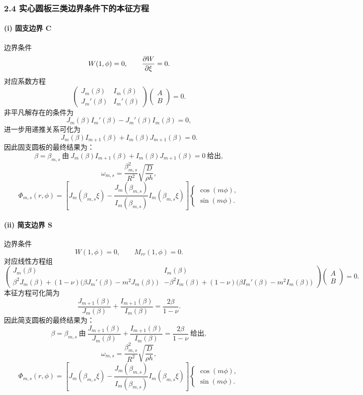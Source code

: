 \documentclass[12pt]{ctexart}
\begin{document}
\subsubsection*{2.4 实心圆板三类边界条件下的本征方程}

\paragraph{(i) 固支边界 C}
边界条件
\[
W(1,\phi)=0,\qquad \pdv{W}{\xi}(1,\phi)=0.
\]
对应系数方程
\[
\begin{pmatrix}
J_m(\beta) & I_m(\beta)\\
J_m'(\beta) & I_m'(\beta)
\end{pmatrix}
\begin{pmatrix} A\\ B \end{pmatrix}=0.
\]
非平凡解存在的条件为
\[
J_m(\beta)I_m'(\beta)-J_m'(\beta)I_m(\beta)=0,
\]
进一步用递推关系可化为
\[
J_m(\beta) I_{m+1}(\beta)+I_m(\beta) J_{m+1}(\beta)=0.
\]
因此固支圆板的最终结果为：
\[
\beta=\beta_{m,s}\ \text{由}\ 
J_m(\beta) I_{m+1}(\beta)+I_m(\beta) J_{m+1}(\beta)=0
\ \text{给出},
\]
\[
\omega_{m,s}
=
\frac{\beta_{m,s}^2}{R^2}\sqrt{\frac{D}{\rho h}},
\]
\[
\Phi_{m,s}(r,\phi)
=
\left[
J_m(\beta_{m,s}\xi)
-\frac{J_m(\beta_{m,s})}{I_m(\beta_{m,s})}I_m(\beta_{m,s}\xi)
\right]
\begin{cases}
\cos(m\phi),\\
\sin(m\phi).
\end{cases}
\]

\paragraph{(ii) 简支边界 S}
边界条件
\[
W(1,\phi)=0,\qquad M_{rr}(1,\phi)=0.
\]
对应线性方程组
\[
\begin{pmatrix}
J_m(\beta) & I_m(\beta)\\
\beta^2 J_m(\beta)+(1-\nu)\bigl(\beta J_m'(\beta)-m^2J_m(\beta)\bigr)
&
-\beta^2 I_m(\beta)+(1-\nu)\bigl(\beta I_m'(\beta)-m^2I_m(\beta)\bigr)
\end{pmatrix}
\begin{pmatrix} A\\ B \end{pmatrix}=0.
\]
本征方程可化简为
\[
\frac{J_{m+1}(\beta)}{J_m(\beta)}+
\frac{I_{m+1}(\beta)}{I_m(\beta)}
=
\frac{2\beta}{1-\nu}.
\]
因此简支圆板的最终结果为：
\[
\beta=\beta_{m,s}\ \text{由}\ 
\frac{J_{m+1}(\beta)}{J_m(\beta)}+
\frac{I_{m+1}(\beta)}{I_m(\beta)}
=
\frac{2\beta}{1-\nu}
\ \text{给出},
\]
\[
\omega_{m,s}
=
\frac{\beta_{m,s}^2}{R^2}\sqrt{\frac{D}{\rho h}},
\]
\[
\Phi_{m,s}(r,\phi)
=
\left[
J_m(\beta_{m,s}\xi)
-\frac{J_m(\beta_{m,s})}{I_m(\beta_{m,s})}I_m(\beta_{m,s}\xi)
\right]
\begin{cases}
\cos(m\phi),\\
\sin(m\phi).
\end{cases}
\]
\end{document}
